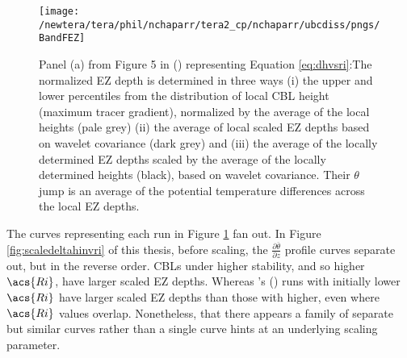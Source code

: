 \begin{figure}[htbp]
    \centering
    \texttt{[image: /newtera/tera/phil/nchaparr/tera2\_cp/nchaparr/ubcdiss/pngs/BandFEZ]}
    \caption[Relationship of Scaled \acs{EZ} depth to Richardson number from \citeauthor{BrooksFowler2}'s (\citeyear{BrooksFowler2})]{Panel (a) from Figure 5 in \citeauthor{BrooksFowler2} (\citeyear{BrooksFowler2}) representing Equation \ref{eq:dhvsri}:The normalized \acs{EZ} depth is determined in three ways (i) the upper and lower percentiles from the distribution of local \acs{CBL} height (maximum tracer gradient), normalized by the average of the local heights (pale grey) (ii) the average of local scaled \acs{EZ} depths based on wavelet covariance (dark grey) and (iii) the average of the locally determined \acs{EZ} depths scaled by the average of the locally determined heights (black), based on wavelet covariance.  Their $\theta$ jump is an average of the potential temperature differences across the local \acs{EZ} depths.}
    \label{fig:BandFEZ}   %
\end{figure}

The curves representing each run in Figure \ref{fig:BandFEZ} fan out.  In Figure \ref{fig:scaledeltahinvri} of this thesis, before scaling, the $\frac{\partial \overline{\theta}}{\partial z}$ profile curves separate out, but in the reverse order.  \acs{CBL}s under higher stability, and so higher $\acs{Ri}$, have larger scaled \acs{EZ} depths.  Whereas \citeauthor{BrooksFowler2}'s (\citeyear{BrooksFowler2}) runs with initially lower $\acs{Ri}$ have larger scaled \acs{EZ} depths than those with higher, even where $\acs{Ri}$ values overlap. Nonetheless, that there appears a family of separate but similar curves rather than a single curve hints at an underlying scaling parameter.\\     

